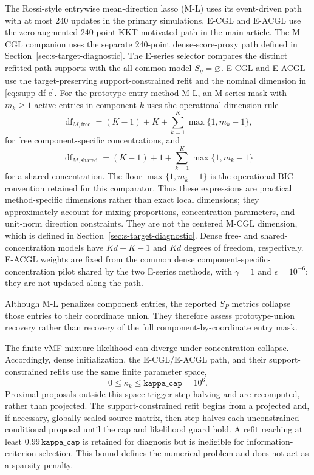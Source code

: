 \documentclass[preprint,12pt,authoryear]{elsarticle}
\begin{document}
The Rossi-style entrywise mean-direction lasso (M-L) uses its event-driven
path with at most 240 updates in the
primary simulations. E-CGL and E-ACGL use the zero-augmented 240-point
KKT-motivated path in the main article. The M-CGL companion uses the separate
240-point dense-score-proxy path defined in
Section~\ref{sec:s-target-diagnostic}. The E-series selector compares the distinct
refitted path supports with the all-common model
$S_\eta=\varnothing$. E-CGL and E-ACGL use the target-preserving
support-constrained refit and the nominal dimension in
\eqref{eq:supp-df-e}.
For the prototype-entry method M-L, an M-series mask with
$m_k\geq1$ active entries in component $k$ uses the operational dimension rule
\[
\operatorname{df}_{M,\mathrm{free}}
=(K-1)+K+\sum_{k=1}^K\max\{1,m_k-1\},
\]
for free component-specific concentrations, and
\[
\operatorname{df}_{M,\mathrm{shared}}
=(K-1)+1+\sum_{k=1}^K\max\{1,m_k-1\}
\]
for a shared concentration. The floor $\max\{1,m_k-1\}$ is the operational
BIC convention retained for this comparator. Thus these expressions are
practical method-specific dimensions rather than exact local dimensions;
they approximately account for mixing proportions, concentration parameters,
and unit-norm direction constraints.
They are not the centered M-CGL dimension, which is defined in
Section~\ref{sec:s-target-diagnostic}. Dense free- and shared-concentration
models have $Kd+K-1$ and $Kd$ degrees of freedom, respectively. E-ACGL weights
are fixed from the common dense component-specific-concentration pilot shared
by the two E-series methods, with $\gamma=1$ and $\epsilon=10^{-6}$; they are
not updated along the path.

Although M-L penalizes component entries, the reported $S_P$ metrics collapse
those entries to their coordinate union. They therefore assess
prototype-union recovery rather than recovery of the full component-by-coordinate
entry mask.

The finite vMF mixture likelihood can diverge under concentration collapse.
Accordingly, dense initialization, the E-CGL/E-ACGL path, and their
support-constrained refits use the same finite parameter space,
\[
0\leq\kappa_k\leq\texttt{kappa\_cap}=10^6.
\]
Proximal proposals outside this space trigger step halving and are recomputed,
rather than projected. The support-constrained refit begins from a projected
and, if necessary, globally scaled source matrix, then step-halves each
unconstrained conditional proposal until the cap and likelihood guard hold. A
refit reaching at least
$0.99\,\texttt{kappa\_cap}$ is retained for diagnosis but is ineligible for
information-criterion selection. This bound defines the numerical problem and
does not act as a sparsity penalty.
\end{document}

